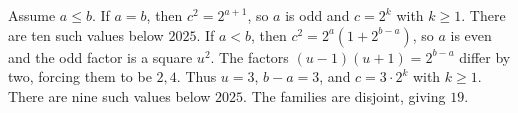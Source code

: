 Assume $a\le b$. If $a=b$, then $c^2=2^{a+1}$, so $a$ is odd and $c=2^k$ with $k\ge1$. There are ten such values below $2025$. If $a<b$, then $c^2=2^a(1+2^{b-a})$, so $a$ is even and the odd factor is a square $u^2$. The factors $(u-1)(u+1)=2^{b-a}$ differ by two, forcing them to be $2,4$. Thus $u=3$, $b-a=3$, and $c=3\cdot2^k$ with $k\ge1$. There are nine such values below $2025$. The families are disjoint, giving $\boxed{19}$.
